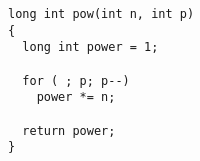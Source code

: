 \begin{verbatim}
long int pow(int n, int p)
{
  long int power = 1;

  for ( ; p; p--)
    power *= n;

  return power;
}
\end{verbatim}
